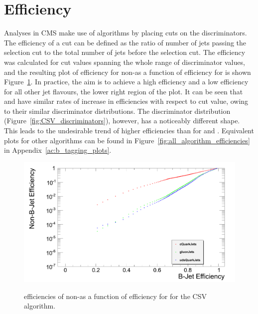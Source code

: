 \section{Efficiency}
\label{s:efficiency}

Analyses in CMS make use of \btagging algorithms by placing cuts on the discriminators. The efficiency of a
cut can be defined as the ratio of number of jets passing the selection cut to the total number of jets before
the selection cut. The efficiency was calculated for cut values spanning the whole range of discriminator
values, and the resulting plot of \btagging efficiency for non-\bjets as a function of \btagging efficiency
for \bjets is shown Figure~\ref{fig:CSV_jet_efficiencies}. In practice, the aim is to achieve a high \bjet
efficiency and a low efficiency for all other jet flavours, \ie the lower right region of the plot. It can be
seen that \udsjets and \gjets have similar rates of increase in efficiencies with respect to cut value, owing
to their similar discriminator distributions. The \cjet discriminator distribution
(Figure~\ref{fig:CSV_discriminators}), however, has a noticeably different shape. This leads to the
undesirable trend of higher \cjet efficiencies than for \udsjets and \gjets. Equivalent plots for other
algorithms can be found in Figure~\ref{fig:all_algorithm_efficiencies} in Appendix~\ref{ac:b_tagging_plots}.

\begin{figure}[hbtp]
   \centering
     \includegraphics[width=\textwidth]{Chapters/04_Analysis/04a_BTags/Images/CombinedSecondaryVertex_nonBJetEfficiency_v_bJetEfficiency}\\
     \caption[\btagging efficiencies of non-\bjets as a function of \btagging efficiency for \bjets for the
     CSV algorithm.]{\btagging efficiencies of non-\bjets as a function of \btagging efficiency for \bjets for
     the CSV algorithm.}
     \label{fig:CSV_jet_efficiencies}
\end{figure}


